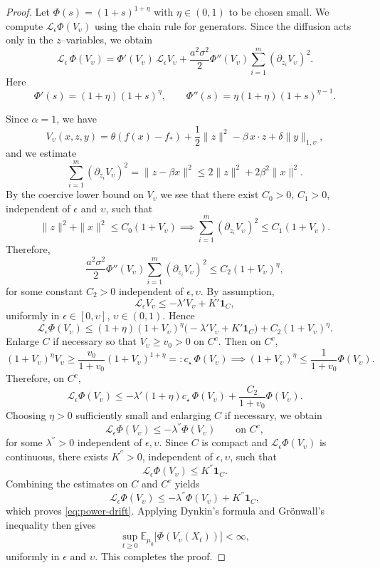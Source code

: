 \documentclass[11pt, a4paper,leqno]{amsart}
\theoremstyle{definition}
\numberwithin{equation}{section}
\begin{document}
\begin{proof}
Let $\Phi(s)=(1+s)^{1+\eta}$ with $\eta\in(0,1)$ to be chosen small.
We compute ${\mathcal L}_\epsilon\Phi(V_\upsilon)$ using the chain rule for generators.
Since the diffusion acts only in the $z$–variables, we obtain
\[
{\mathcal L}_\epsilon\,\Phi(V_\upsilon)
=\Phi'(V_\upsilon)\,{\mathcal L}_\epsilon V_\upsilon
+\frac{a^2\sigma^2}{2}\Phi''(V_\upsilon)
\sum_{i=1}^m(\partial_{z_i}V_\upsilon)^2 .
\]
Here
\[
\Phi'(s)=(1+\eta)(1+s)^{\eta},
\qquad
\Phi''(s)=\eta(1+\eta)(1+s)^{\eta-1}.
\]

\medskip

\noindent
Since $\alpha=1$, we have
\[
V_\upsilon(x,z,y)
= \theta(f(x)-f_\ast)
+ \frac12\|z\|^2
- \beta\, x\cdot z
+ \delta\|y\|_{1,\upsilon},
\]
and we estimate
\[
\sum_{i=1}^m(\partial_{z_i}V_\upsilon)^2
= \|z-\beta x\|^2
\le 2\|z\|^2 + 2\beta^2\|x\|^2.
\]
By the coercive lower bound on $V_\upsilon$ we see that there exist $C_0>0$, $C_1>0$, independent of $\epsilon$ and $\upsilon$,
such that
\[
\|z\|^2+\|x\|^2
\le C_0(1+V_\upsilon)\implies
\sum_{i=1}^m(\partial_{z_i}V_\upsilon)^2
\le C_1(1+V_\upsilon).
\]
Therefore,
\[
\frac{a^2\sigma^2}{2}\Phi''(V_\upsilon)
\sum_{i=1}^m(\partial_{z_i}V_\upsilon)^2
\le C_2(1+V_\upsilon)^{\eta},
\]
for some constant $C_2>0$ independent of $\epsilon,\upsilon$. By assumption,
\[
{\mathcal L}_\epsilon V_\upsilon
\le -\lambda' V_\upsilon + K'\mathbf 1_{C},
\]
uniformly in $\epsilon\in[0,\upsilon]$, $\upsilon\in(0,1)$.
Hence
\[
{\mathcal L}_\epsilon\Phi(V_\upsilon)
\le (1+\eta)(1+V_\upsilon)^{\eta}
\bigl(-\lambda' V_\upsilon + K'\mathbf 1_{C}\bigr)
+ C_2(1+V_\upsilon)^{\eta}.
\]
Enlarge $C$ if necessary so that $V_\upsilon\ge v_0>0$ on $C^c$.
Then on $C^c$,
\[
(1+V_\upsilon)^{\eta}V_\upsilon
\ge \frac{v_0}{1+v_0}(1+V_\upsilon)^{1+\eta}
=: c_\star\,\Phi(V_\upsilon)\implies
(1+V_\upsilon)^{\eta}
\le \frac{1}{1+v_0}\Phi(V_\upsilon).
\]
Therefore, on $C^c$,
\[
{\mathcal L}_\epsilon\Phi(V_\upsilon)
\le -\lambda'(1+\eta)c_\star\,\Phi(V_\upsilon)
+ \frac{C_2}{1+v_0}\Phi(V_\upsilon).
\]
Choosing $\eta>0$ sufficiently small and enlarging $C$ if necessary,
we obtain
\[
{\mathcal L}_\epsilon\Phi(V_\upsilon)
\le -\lambda^{''}\Phi(V_\upsilon)
\qquad \text{on } {C}^c,
\]
for some $\lambda^{''}>0$ independent of $\epsilon,\upsilon$. Since $C$ is compact and ${\mathcal L}_\epsilon\Phi(V_\upsilon)$
is continuous, there exists $K^{''}>0$,
independent of $\epsilon,\upsilon$, such that
\[
{\mathcal L}_\epsilon\Phi(V_\upsilon)
\le K^{''}\mathbf 1_{C}.
\]
Combining the estimates on $C$ and ${C}^c$ yields
\[
{\mathcal L}_\epsilon\Phi(V_\upsilon)
\le -\lambda^{''}\Phi(V_\upsilon)
+ K^{''}\mathbf 1_{C},
\]
which proves \eqref{eq:power-drift}. Applying Dynkin's formula and Grönwall's inequality then gives
\[
\sup_{t\ge0}
\mathbb E_{\mu_0}\bigl[\Phi(V_\upsilon(X_t))\bigr]
<\infty,
\]
uniformly in $\epsilon$ and $\upsilon$. This completes the proof.
\end{proof}
\end{document}
